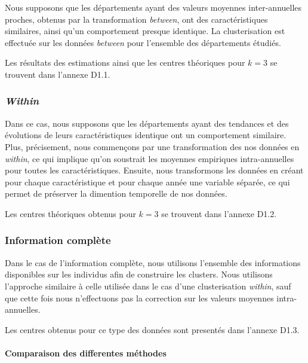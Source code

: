 \documentclass[11pt,]{article}
\let\oldparagraph\paragraph
\renewcommand{\paragraph}[1]{\oldparagraph{#1}\mbox{}}
\begin{document}
Nous supposons que les départements ayant des valeurs moyennes
inter-annuelles proches, obtenus par la transformation \emph{between},
ont des caractéristiques similaires, ainsi qu'un comportement presque
identique. La clusterisation est effectuée sur les données
\emph{between} pour l'ensemble des départements étudiés.

Les résultats des estimations ainsi que les centres théoriques pour
\(k = 3\) se trouvent dans l'annexe D1.1.

\hypertarget{within}{%
\subsubsection{\texorpdfstring{\emph{Within}}{Within}}\label{within}}

Dans ce cas, nous supposons que les départements ayant des tendances et
des évolutions de leurs caractéristiques identique ont un comportement
similaire. Plus, précisement, nous commençons par une transformation des
nos données en \emph{within}, ce qui implique qu'on soustrait les
moyennes empiriques intra-annuelles pour toutes les caractéristiques.
Ensuite, nous transformons les données en créant pour chaque
caractéristique et pour chaque année une variable séparée, ce qui permet
de préserver la dimention temporelle de nos données.

Les centres théoriques obtenus pour \(k = 3\) se trouvent dans l'annexe
D1.2.

\hypertarget{information-complete}{%
\subsubsection{Information complète}\label{information-complete}}

Dans le cas de l'information complète, nous utilisons l'ensemble des
informations disponibles sur les individus afin de construire les
clusters. Nous utilisons l'approche similaire à celle utilisée dans le
cas d'une clusterisation \emph{within}, sauf que cette fois nous
n'effectuons pas la correction sur les valeurs moyennes intra-annuelles.

Les centres obtenus pour ce type des données sont presentés dans
l'annexe D1.3.

\hypertarget{comparaison-des-differentes-methodes}{%
\paragraph{Comparaison des differentes
méthodes}\label{comparaison-des-differentes-methodes}}
\end{document}
